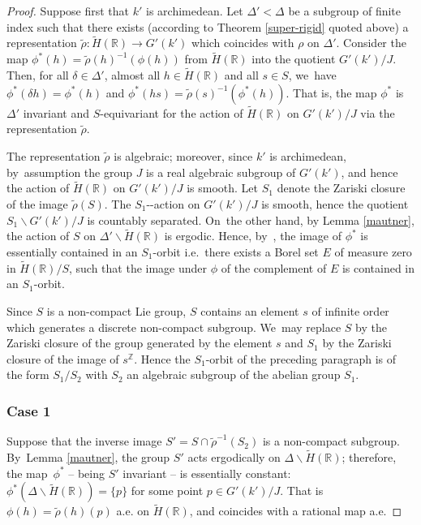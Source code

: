 \documentclass[10pt,a4paper]{amsart}
\newcommand{\ie}{i.e.\ }
\providecommand{\nobreakdash}{\nobreak\hbox{-}}
\theoremstyle{definition}
\newcommand{\field}[1]{\mathbb{#1}}
\newcommand{\R}{\field{R}}
\newcommand{\Z}{\field{Z}}
\let\bs\backslash
\begin{document}
\begin{proof} Suppose first that $k'$ is archimedean. Let $\Delta '< \Delta $ be a subgroup of
finite index such that there exists (according to Theorem \ref{super-rigid} quoted above) a representation $\tilde \rho :\tilde
H(\R)\to G'(k')$ which coincides with $\rho $ on $\Delta '$. Consider the map $\phi ^*(h)=\tilde \rho (h)^{-1}(\phi (h))$ from $\tilde
H(\R)$ into the quotient $G'(k')/J$. Then, for all $\delta \in \Delta '$, almost all
$h\in \tilde H(\R)$ and all $s\in S$, we~have $\phi ^*(\delta h)= \phi ^*(h)$ and $\phi ^*(hs)=\tilde \rho (s)^{-1}(\phi ^*(h))$. That is,
the map $\phi ^*$ is $\Delta '$ invariant and $S$-equivariant for the action of $\tilde H(\R)$ on $G'(k')/J$ via the representation $\tilde
\rho $.\enlargethispage{-.5\baselineskip}%

The representation $\tilde \rho$ is algebraic; moreover, since $k'$ is
archimedean, by~assumption the group $J$ is a real algebraic subgroup
of $G'(k')$, and hence the action of $\tilde H(\R)$ on $G'(k')/J$ is
smooth. Let $S_1$ denote the Zariski closure of the image $\tilde
\rho (S)$. The $S_1$\nobreakdash-action on $G'(k')/J$ is smooth, hence the
quotient $S_1\bs G'(k')/J$ is countably separated. On~the other hand,
by Lemma \ref{mautner}, the action of $S$ on $\Delta '\bs \tilde
H(\R)$ is ergodic. Hence, by~\cite[Prop.\,(2.1.11)]{Z}, the
image of $\phi ^*$ is essentially contained in an $S_1$-orbit
\ie there exists a Borel set $E$ of measure zero in $\tilde H(\R)/S$,
such that the image under $\phi$ of the complement of $E$ is
contained in an $S_1$-orbit.

Since $S$ is a non-compact Lie group, $S$ contains an element $s$ of
infinite order which generates a discrete non-compact subgroup. We~may
replace $S$ by the Zariski closure of the group generated by the element $s$ and $S_1$
by the Zariski closure of the image of $s^{\Z}$. Hence the $S_1$-orbit of the preceding paragraph is of the
form $S_1/S_2$ with $S_2$ an algebraic subgroup of the abelian group
$S_1$.

\subsubsection*{Case 1}
Suppose that the inverse image $S'=S\cap \tilde \rho ^{-1}(S_2)$ is a
non-compact subgroup. By~Lemma \ref{mautner}, the group $S'$ acts
ergodically on $\Delta \bs \tilde H(\R)$; therefore, the map~$\phi ^*$ -- being $S'$ invariant -- is essentially constant: $\phi ^*(\Delta \bs \tilde
H(\R))=\{p\}$ for some point $p\in G'(k')/J$. That is $\phi (h)=\tilde
\rho (h)(p)$ a.e. on $\tilde{H}(\R)$, and coincides with a rational map a.e.


\end{proof}
\end{document}
